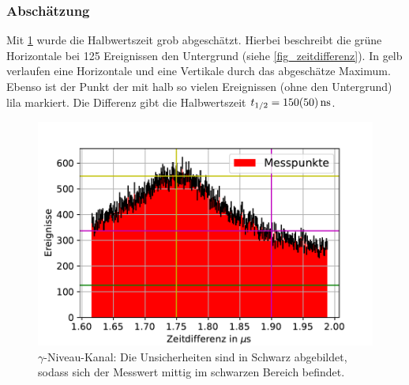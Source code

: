 \documentclass[
	a4paper,
	12pt,
	pagesize,
	ngerman
]{scrartcl}
\begin{document}
		\subsubsection*{Abschätzung}
		Mit \cref{fig_zeitdifferenz_zoom} wurde die Halbwertszeit grob abgeschätzt.
		Hierbei beschreibt die grüne Horizontale bei \SI{125}{} Ereignissen den Untergrund (siehe \cref{fig_zeitdifferenz}).
		In gelb verlaufen eine Horizontale und eine Vertikale durch das abgeschätze Maximum.
		Ebenso ist der Punkt der mit halb so vielen Ereignissen (ohne den Untergrund) lila markiert.
		Die Differenz gibt die Halbwertszeit $t_{1/2}=\SI{150+-50}{ns}$.
		\begin{figure}[H]
				\includegraphics[width= 0.9 \linewidth]{img/Zeitdifferenzen_zoom}
				\caption{
					$\gamma$-Niveau-Kanal:
				Die Unsicherheiten sind in Schwarz abgebildet, sodass sich der Messwert mittig im schwarzen Bereich befindet.
				}
				\label{fig_zeitdifferenz_zoom}
		\end{figure}
\end{document}
